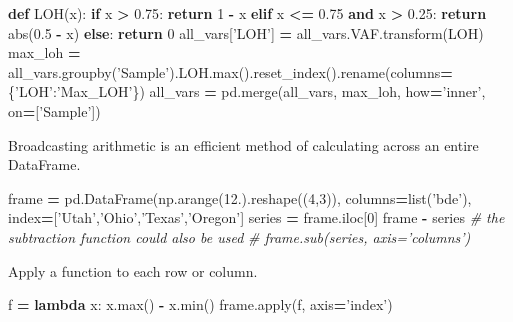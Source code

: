 \documentclass[]{book}
\newenvironment{Shaded}{\begin{snugshade}}{\end{snugshade}}
\newcommand{\KeywordTok}[1]{\textcolor[rgb]{0.13,0.29,0.53}{\textbf{#1}}}
\newcommand{\DecValTok}[1]{\textcolor[rgb]{0.00,0.00,0.81}{#1}}
\newcommand{\FloatTok}[1]{\textcolor[rgb]{0.00,0.00,0.81}{#1}}
\newcommand{\StringTok}[1]{\textcolor[rgb]{0.31,0.60,0.02}{#1}}
\newcommand{\CommentTok}[1]{\textcolor[rgb]{0.56,0.35,0.01}{\textit{#1}}}
\newcommand{\ControlFlowTok}[1]{\textcolor[rgb]{0.13,0.29,0.53}{\textbf{#1}}}
\newcommand{\OperatorTok}[1]{\textcolor[rgb]{0.81,0.36,0.00}{\textbf{#1}}}
\newcommand{\BuiltInTok}[1]{#1}
\newcommand{\NormalTok}[1]{#1}
\begin{document}
\begin{Shaded}
\begin{Highlighting}[]
\KeywordTok{def}\NormalTok{ LOH(x):}
    \ControlFlowTok{if}\NormalTok{ x }\OperatorTok{>} \FloatTok{0.75}\NormalTok{: }\ControlFlowTok{return} \DecValTok{1} \OperatorTok{-}\NormalTok{ x}
    \ControlFlowTok{elif}\NormalTok{ x }\OperatorTok{<=} \FloatTok{0.75} \KeywordTok{and}\NormalTok{ x }\OperatorTok{>} \FloatTok{0.25}\NormalTok{: }\ControlFlowTok{return} \BuiltInTok{abs}\NormalTok{(}\FloatTok{0.5} \OperatorTok{-}\NormalTok{ x)}
    \ControlFlowTok{else}\NormalTok{: }\ControlFlowTok{return} \DecValTok{0}
\NormalTok{all_vars[}\StringTok{'LOH'}\NormalTok{] }\OperatorTok{=}\NormalTok{ all_vars.VAF.transform(LOH)}
\NormalTok{max_loh }\OperatorTok{=}\NormalTok{ all_vars.groupby(}\StringTok{'Sample'}\NormalTok{).LOH.}\BuiltInTok{max}\NormalTok{().reset_index().rename(columns}\OperatorTok{=}\NormalTok{\{}\StringTok{'LOH'}\NormalTok{:}\StringTok{'Max_LOH'}\NormalTok{\})}
\NormalTok{all_vars }\OperatorTok{=}\NormalTok{ pd.merge(all_vars, max_loh, how}\OperatorTok{=}\StringTok{'inner'}\NormalTok{, on}\OperatorTok{=}\NormalTok{[}\StringTok{'Sample'}\NormalTok{])}
\end{Highlighting}
\end{Shaded}

Broadcasting arithmetic is an efficient method of calculating across an
entire DataFrame.

\begin{Shaded}
\begin{Highlighting}[]
\NormalTok{frame }\OperatorTok{=}\NormalTok{ pd.DataFrame(np.arange(}\DecValTok{12}\NormalTok{.).reshape((}\DecValTok{4}\NormalTok{,}\DecValTok{3}\NormalTok{)), columns}\OperatorTok{=}\BuiltInTok{list}\NormalTok{(}\StringTok{'bde'}\NormalTok{), index}\OperatorTok{=}\NormalTok{[}\StringTok{'Utah'}\NormalTok{,}\StringTok{'Ohio'}\NormalTok{,}\StringTok{'Texas'}\NormalTok{,}\StringTok{'Oregon'}\NormalTok{]}
\NormalTok{series }\OperatorTok{=}\NormalTok{ frame.iloc[}\DecValTok{0}\NormalTok{]}
\NormalTok{frame }\OperatorTok{-}\NormalTok{ series}
\CommentTok{# the subtraction function could also be used}
\CommentTok{# frame.sub(series, axis='columns')}
\end{Highlighting}
\end{Shaded}

Apply a function to each row or column.

\begin{Shaded}
\begin{Highlighting}[]
\NormalTok{f }\OperatorTok{=} \KeywordTok{lambda}\NormalTok{ x: x.}\BuiltInTok{max}\NormalTok{() }\OperatorTok{-}\NormalTok{ x.}\BuiltInTok{min}\NormalTok{()}
\NormalTok{frame.}\BuiltInTok{apply}\NormalTok{(f, axis}\OperatorTok{=}\StringTok{'index'}\NormalTok{)}
\end{Highlighting}
\end{Shaded}
\end{document}
